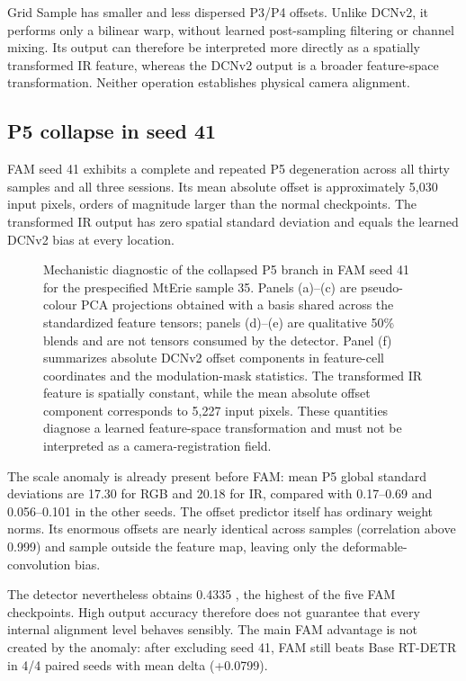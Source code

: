 Grid Sample has smaller and less dispersed P3/P4 offsets. Unlike DCNv2, it
performs only a bilinear warp, without learned post-sampling filtering or
channel mixing. Its output can therefore be interpreted more directly as a
spatially transformed IR feature, whereas the DCNv2 output is a broader
feature-space transformation. Neither operation establishes physical camera
alignment.

\subsection{P5 collapse in seed 41}
\label{sec:p5-collapse}

FAM seed 41 exhibits a complete and repeated P5 degeneration across all thirty
samples and all three sessions. Its mean absolute offset is approximately
5,030 input pixels, orders of magnitude larger than the normal checkpoints.
The transformed IR output has zero spatial standard deviation and equals the
learned DCNv2 bias at every location.

\begin{figure}[p]
  \centering
  \caption{Mechanistic diagnostic of the collapsed P5 branch in FAM seed 41
  for the prespecified MtErie sample 35. Panels (a)--(c) are pseudo-colour PCA
  projections obtained with a basis shared across the standardized feature
  tensors; panels (d)--(e) are qualitative 50\% blends and are not tensors
  consumed by the detector. Panel (f) summarizes absolute DCNv2 offset
  components in feature-cell coordinates and the modulation-mask statistics.
  The transformed IR feature is spatially constant, while the mean absolute
  offset component corresponds to 5,227 input pixels. These quantities diagnose
  a learned feature-space transformation and must not be interpreted as a
  camera-registration field.}
  \label{fig:fam-p5-collapse}
\end{figure}

The scale anomaly is already present before FAM: mean P5 global standard
deviations are 17.30 for RGB and 20.18 for IR, compared with 0.17--0.69 and
0.056--0.101 in the other seeds. The offset predictor itself has ordinary
weight norms. Its enormous offsets are nearly identical across samples
(correlation above 0.999) and sample outside the feature map, leaving only the
deformable-convolution bias.

The detector nevertheless obtains 0.4335 \mapfifty{}, the highest of the five
FAM checkpoints. High output accuracy therefore does not guarantee that every
internal alignment level behaves sensibly. The main FAM advantage is not
created by the anomaly: after excluding seed 41, FAM still beats Base RT-DETR in
4/4 paired seeds with mean delta (+0.0799).

